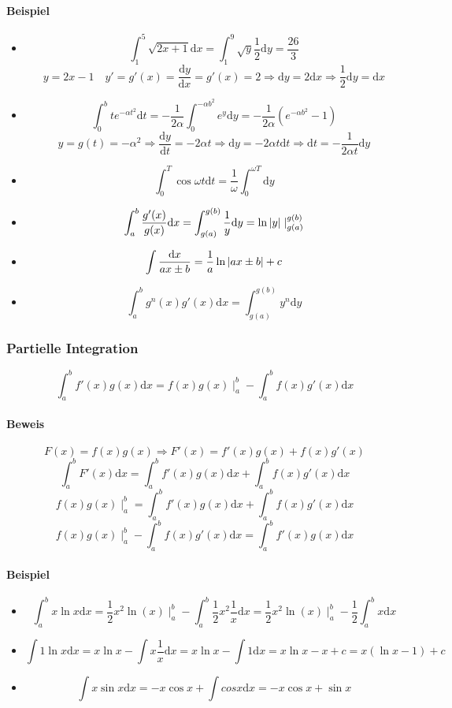 \documentclass[a4paper]{scrartcl}
\DeclarePairedDelimiter\abs{\lvert}{\rvert}%
\begin{document}
\paragraph{Beispiel}
\label{sec-11-3-2-2}
\begin{itemize}
\item \[\int_1^5\sqrt{2x+1}\mathrm{d}x = \int_1^9\sqrt{y}\frac{1}{2}\mathrm{d}y=\frac{26}{3}\]
       \[y=2x-1\quad y'=g'(x) =\frac{\mathrm{d}y}{\mathrm{d}x} = g'(x) = 2 \Rightarrow \mathrm{d}y = 2\mathrm{d}x \Rightarrow \frac{1}{2}\mathrm{d}y = \mathrm{d}x\]
\item \[\int_0^b t e^{-\alpha t^2}\mathrm{d}t = -\frac{1}{2\alpha}\int_0^{-\alpha b^2} e^y\mathrm{d}y = -\frac{1}{2\alpha}(e^{-\alpha b^2} - 1)\]
       \[y=g(t)=-\alpha ^2 \Rightarrow \frac{\mathrm{d}y}{\mathrm{d}t}=-2\alpha t \Rightarrow \mathrm{d}y=-2\alpha t \mathrm{d}t \Rightarrow \mathrm{d}t = -\frac{1}{2\alpha t}\mathrm{d}y\]
\item \[\int_0^T \cos{\omega t}\mathrm{d}t = \frac{1}{\omega}\int_0^{\omega T}\mathrm{d}y\]
\item \[\int_a^b \frac{g'(x)}{g(x)}\mathrm{d}x = \int_{g(a)}^{g(b)}\frac{1}{y}\mathrm{d}y=\ln{\abs{y}}\mid_{g(a)}^{g(b)}\]
\item \[\int \frac{\mathrm{d}x}{ax\pm b} = \frac{1}{a}\ln{\abs{ax\pm b}} + c\]
\item \[\int_a^b g^n(x)g'(x)\mathrm{d}x = \int_{g(a)}^{g(b)} y^n\mathrm{d}y\]
\end{itemize}
\subsubsection{Partielle Integration}
\label{sec-11-3-3}
\[\int_a^b f'(x)g(x)\mathrm{d}x = f(x)g(x)\mid_a^b - \int_a^b f(x)g'(x)\mathrm{d}x\]
\paragraph{Beweis}
\label{sec-11-3-3-1}
\[F(x)=f(x)g(x)\Rightarrow F'(x) = f'(x)g(x) + f(x)g'(x)\]
\[\int_a^b F'(x)\mathrm{d}x = \int_a^b f'(x)g(x)\mathrm{d}x + \int_a^b f(x)g'(x)\mathrm{d}x\]
\[f(x)g(x)\mid_a^b = \int_a^b f'(x)g(x)\mathrm{d}x + \int_a^b f(x)g'(x)\mathrm{d}x\]
\[f(x)g(x)\mid_a^b - \int_a^b f(x)g'(x)\mathrm{d}x = \int_a^b f'(x)g(x)\mathrm{d}x\]
\paragraph{Beispiel}
\label{sec-11-3-3-2}
\begin{itemize}
\item \[\int_a^b x\ln{x}\mathrm{d}x = \frac{1}{2}x^2\ln(x)\mid_a^b - \int_a^b \frac{1}{2}x^2 \frac{1}{x}\mathrm{d}x = \frac{1}{2}x^2\ln(x)\mid_a^b - \frac{1}{2}\int_a^b x\mathrm{d}x\]
\item \[\int 1\ln{x}\mathrm{d}x = x\ln{x} - \int x\frac{1}{x}\mathrm{d}x = x\ln{x} - \int 1\mathrm{d}x = x\ln{x}-x+c=x(\ln{x}-1)+c\]
\item \[\int x\sin{x}\mathrm{d}x=-x\cos{x} + \int cos{x}\mathrm{d}x = -x\cos{x}+\sin{x}\]
\end{itemize}
\end{document}
